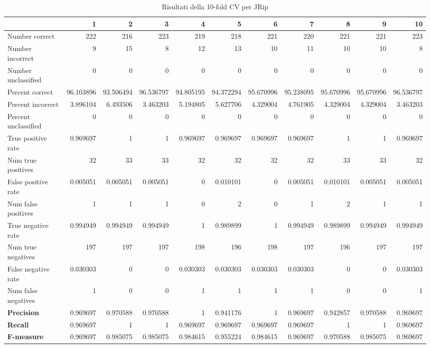 \begin{table}[htbp]
	\scriptsize
	\begin{adjustbox}{center}
		\begin{tabular}{|l|r|r|r|r|r|r|r|r|r|r|}
		\hline
		\diagbox[width=11em]{\emph{Measures}}{\emph{Key Fold}} & 1 & 2 & 3 & 4 & 5 & 6 & 7 & 8 & 9 & 10 \\ \hline
		Number correct & 222 & 216 & 223 & 219 & 218 & 221 & 220 & 221 & 221 & 223 \\ \hline
		Number incorrect & 9 & 15 & 8 & 12 & 13 & 10 & 11 & 10 & 10 & 8 \\ \hline
		Number unclassified & 0 & 0 & 0 & 0 & 0 & 0 & 0 & 0 & 0 & 0 \\ \hline
		Percent correct & 96.103896 & 93.506494 & 96.536797 & 94.805195 & 94.372294 & 95.670996 & 95.238095 & 95.670996 & 95.670996 & 96.536797 \\ \hline
		Percent incorrect & 3.896104 & 6.493506 & 3.463203 & 5.194805 & 5.627706 & 4.329004 & 4.761905 & 4.329004 & 4.329004 & 3.463203 \\ \hline
		Percent unclassified & 0 & 0 & 0 & 0 & 0 & 0 & 0 & 0 & 0 & 0 \\ \hline
		True positive rate & 0.969697 & 1 & 1 & 0.969697 & 0.969697 & 0.969697 & 0.969697 & 1 & 1 & 0.969697 \\ \hline
		Num true positives & 32 & 33 & 33 & 32 & 32 & 32 & 32 & 33 & 33 & 32 \\ \hline
		False positive rate & 0.005051 & 0.005051 & 0.005051 & 0 & 0.010101 & 0 & 0.005051 & 0.010101 & 0.005051 & 0.005051 \\ \hline
		Num false positives & 1 & 1 & 1 & 0 & 2 & 0 & 1 & 2 & 1 & 1 \\ \hline
		True negative rate & 0.994949 & 0.994949 & 0.994949 & 1 & 0.989899 & 1 & 0.994949 & 0.989899 & 0.994949 & 0.994949 \\ \hline
		Num true negatives & 197 & 197 & 197 & 198 & 196 & 198 & 197 & 196 & 197 & 197 \\ \hline
		False negative rate & 0.030303 & 0 & 0 & 0.030303 & 0.030303 & 0.030303 & 0.030303 & 0 & 0 & 0.030303 \\ \hline
		Num false negatives & 1 & 0 & 0 & 1 & 1 & 1 & 1 & 0 & 0 & 1 \\ \hline
		\textbf{Precision} & 0.969697 & 0.970588 & 0.970588 & 1 & 0.941176 & 1 & 0.969697 & 0.942857 & 0.970588 & 0.969697 \\ \hline
		\textbf{Recall} & 0.969697 & 1 & 1 & 0.969697 & 0.969697 & 0.969697 & 0.969697 & 1 & 1 & 0.969697 \\ \hline
		\textbf{F-measure} & 0.969697 & 0.985075 & 0.985075 & 0.984615 & 0.955224 & 0.984615 & 0.969697 & 0.970588 & 0.985075 & 0.969697 \\ \hline
	\end{tabular}
\end{adjustbox}
	\caption{Risultati della 10-fold CV per JRip}
	\label{}
\end{table}
